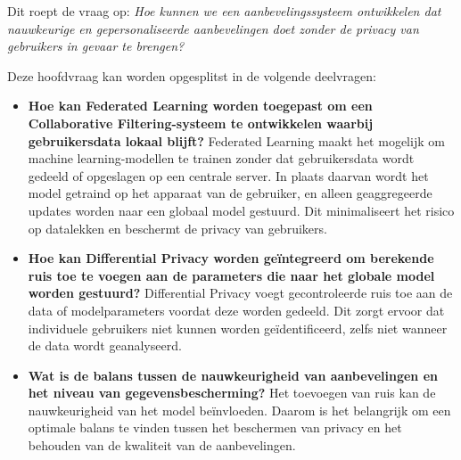 Dit roept de vraag op: \textit{Hoe kunnen we een aanbevelingssysteem ontwikkelen dat nauwkeurige en gepersonaliseerde aanbevelingen doet zonder de privacy van gebruikers in gevaar te brengen?}

Deze hoofdvraag kan worden opgesplitst in de volgende deelvragen:
\begin{itemize}
  \item \textbf{Hoe kan Federated Learning worden toegepast om een Collaborative Filtering-systeem te ontwikkelen waarbij gebruikersdata lokaal blijft?}
  Federated Learning maakt het mogelijk om machine learning-modellen te trainen zonder dat gebruikersdata wordt gedeeld of opgeslagen op een centrale server. In plaats daarvan wordt het model getraind op het apparaat van de gebruiker, en alleen geaggregeerde updates worden naar een globaal model gestuurd. Dit minimaliseert het risico op datalekken en beschermt de privacy van gebruikers.
  \item \textbf{Hoe kan Differential Privacy worden geïntegreerd om berekende ruis toe te voegen aan de parameters die naar het globale model worden gestuurd?}
  Differential Privacy voegt gecontroleerde ruis toe aan de data of modelparameters voordat deze worden gedeeld. Dit zorgt ervoor dat individuele gebruikers niet kunnen worden geïdentificeerd, zelfs niet wanneer de data wordt geanalyseerd.
  \item \textbf{Wat is de balans tussen de nauwkeurigheid van aanbevelingen en het niveau van gegevensbescherming?}
  Het toevoegen van ruis kan de nauwkeurigheid van het model beïnvloeden. Daarom is het belangrijk om een optimale balans te vinden tussen het beschermen van privacy en het behouden van de kwaliteit van de aanbevelingen.
\end{itemize}

\section{}%
\label{sec:onderzoeksdoelstelling}


